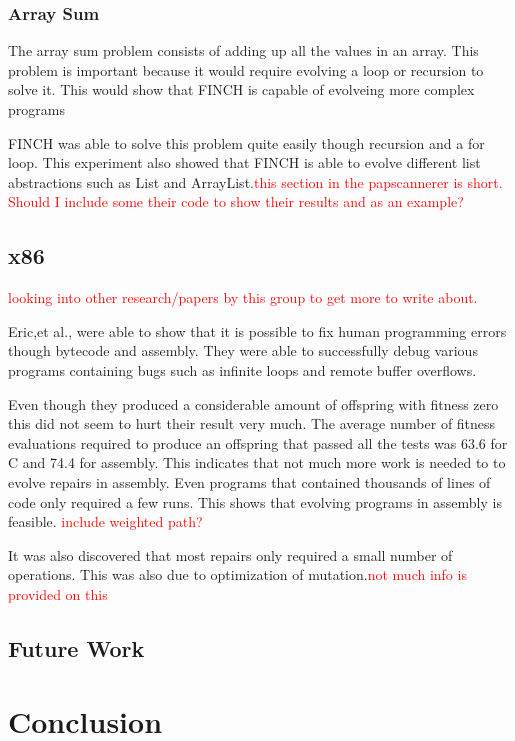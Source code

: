 \documentclass{sig-alternate}
\newcommand{\mycomment}[1]{\textcolor{red}{#1}}
\begin{document}
\subsubsection{Array Sum}
The array sum problem consists of adding up all the values in an array. This problem is important because it would require evolving a loop or recursion to solve it. This would show that FINCH is capable of evolveing more complex programs\par
FINCH was able to solve this problem quite easily though recursion and a for loop. This experiment also showed that FINCH is able to evolve different list abstractions such as List and ArrayList.\mycomment{this section in the papscannerer is short. Should I include some their code to show their results and as an example?} 


\subsection{x86}
\mycomment{looking into other research/papers by this group to get more to write about.}

Eric,et al., were able to show that it is possible to fix human programming errors though bytecode and assembly. They were able to successfully debug various programs containing bugs such as infinite loops and remote buffer overflows.

Even though they produced a considerable amount of offspring with fitness zero this did not seem to hurt their result very much. The average number of fitness evaluations required to produce an offspring that passed all the tests was 63.6 for C and 74.4 for assembly. This indicates that not much more work is needed to to evolve repairs in assembly. Even programs that contained thousands of lines of code only required a few runs. This shows that evolving programs in assembly is feasible. \mycomment{include weighted path?}

It was also discovered that most repairs only required a small number of operations. This was also due to optimization of mutation.\mycomment{not much info is provided on this}


\subsection{Future Work}



\section{Conclusion}
\end{document}

